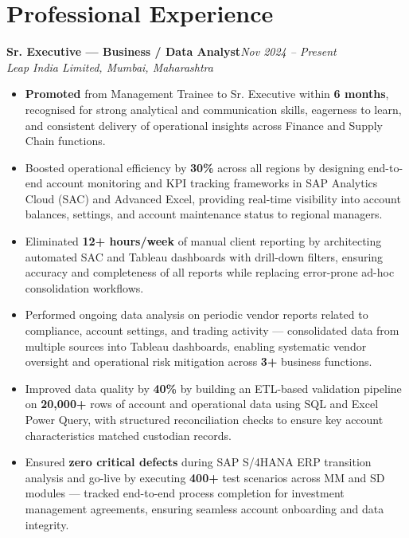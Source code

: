 \documentclass[10pt, letterpaper]{article}
\newcommand{\role}[3]{%
  \vspace{2pt}%
  {\bfseries #1}\hfill{\small\color{muted}\textit{#3}}\\[-2pt]%
  {\small\color{muted}\textit{#2}}%
}
\begin{document}
\section{Professional Experience}

\role{Sr. Executive — Business / Data Analyst}{Leap India Limited, Mumbai, Maharashtra}{Nov 2024 – Present}

\begin{itemize}
  \item \textbf{Promoted} from Management Trainee to Sr. Executive within \textbf{6 months}, recognised for strong analytical and communication skills, eagerness to learn, and consistent delivery of operational insights across Finance and Supply Chain functions.
  \item Boosted operational efficiency by \textbf{30\%} across all regions by designing end-to-end account monitoring and KPI tracking frameworks in SAP Analytics Cloud (SAC) and Advanced Excel, providing real-time visibility into account balances, settings, and account maintenance status to regional managers.
  \item Eliminated \textbf{12+ hours/week} of manual client reporting by architecting automated SAC and Tableau dashboards with drill-down filters, ensuring accuracy and completeness of all reports while replacing error-prone ad-hoc consolidation workflows.
  \item Performed ongoing data analysis on periodic vendor reports related to compliance, account settings, and trading activity — consolidated data from multiple sources into Tableau dashboards, enabling systematic vendor oversight and operational risk mitigation across \textbf{3+} business functions.
  \item Improved data quality by \textbf{40\%} by building an ETL-based validation pipeline on \textbf{20,000+} rows of account and operational data using SQL and Excel Power Query, with structured reconciliation checks to ensure key account characteristics matched custodian records.
  \item Ensured \textbf{zero critical defects} during SAP S/4HANA ERP transition analysis and go-live by executing \textbf{400+} test scenarios across MM and SD modules — tracked end-to-end process completion for investment management agreements, ensuring seamless account onboarding and data integrity.
\end{itemize}

\vspace{1pt}
\end{document}
